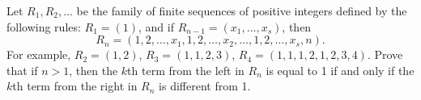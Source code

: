 Let $R_1, R_2, \ldots$ be the family of finite sequences of positive integers defined by the following rules: $R_1 = (1)$, and if $R_{n-1} = (x_1, \ldots, x_s)$, then
\[ R_n = (1, 2, \ldots, x_1, 1, 2, \ldots, x_2, \ldots, 1, 2, \ldots, x_s, n). \]
For example, $R_2 = (1,2)$, $R_3 = (1,1,2,3)$, $R_4 = (1,1,1,2,1,2,3,4)$. Prove that if $n > 1$, then the $k$th term from the left in $R_n$ is equal to 1 if and only if the $k$th term from the right in $R_n$ is different from 1.
